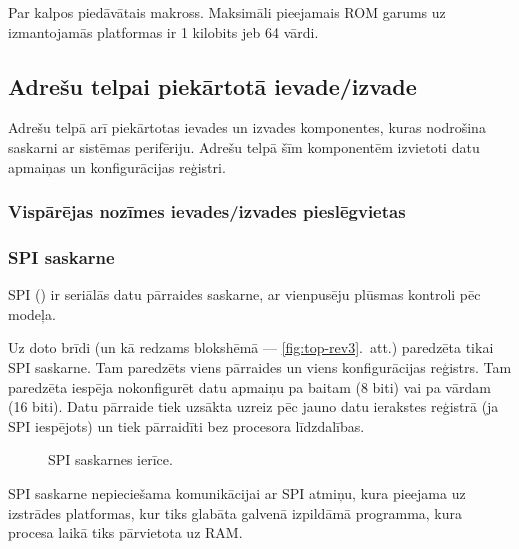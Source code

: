 	Par  kalpos  piedāvātais
	 makross.\cite{FlashROM}
	Maksimāli pieejamais ROM garums uz izmantojamās platformas ir
	1 kilobits jeb 64 vārdi.\cite{FusionGuide}

\subsection{Adrešu telpai piekārtotā ievade/izvade}
	Adrešu telpā arī piekārtotas ievades un izvades komponentes,
	kuras nodrošina saskarni ar sistēmas perifēriju. Adrešu telpā šīm
	komponentēm izvietoti datu apmaiņas un konfigurācijas reģistri.
	
	\subsubsection{Vispārējas nozīmes ievades/izvades pieslēgvietas}
	\todo
	
	\subsubsection{SPI saskarne}
	SPI () ir seriālās
	datu pārraides saskarne, ar vienpusēju plūsmas kontroli pēc
	 modeļa.
	
	
	
	Uz doto brīdi (un kā redzams blokshēmā — \ref{fig:top-rev3}.~att.)
	paredzēta tikai SPI saskarne. Tam paredzēts viens pārraides un viens
	konfigurācijas reģistrs. Tam paredzēta iespēja nokonfigurēt datu
	apmaiņu pa baitam (8 biti) vai pa vārdam (16 biti). Datu pārraide tiek
	uzsākta uzreiz pēc jauno datu ierakstes reģistrā (ja SPI iespējots) un
	tiek pārraidīti bez procesora līdzdalības.
	
	\begin{figure}[thp]
		\centering
		\def\svgscale{1.25}
		{\ttfamily\scriptsize}
		\caption{SPI saskarnes ierīce.}
		\label{fig:spi}
	\end{figure}
	
	SPI saskarne nepieciešama komunikācijai ar SPI  atmiņu,
	kura pieejama uz izstrādes platformas,\cite[43.~lpp.]{FusionGuide}
	kur tiks glabāta galvenā izpildāmā programma, kura  procesa
	laikā tiks pārvietota uz RAM.
